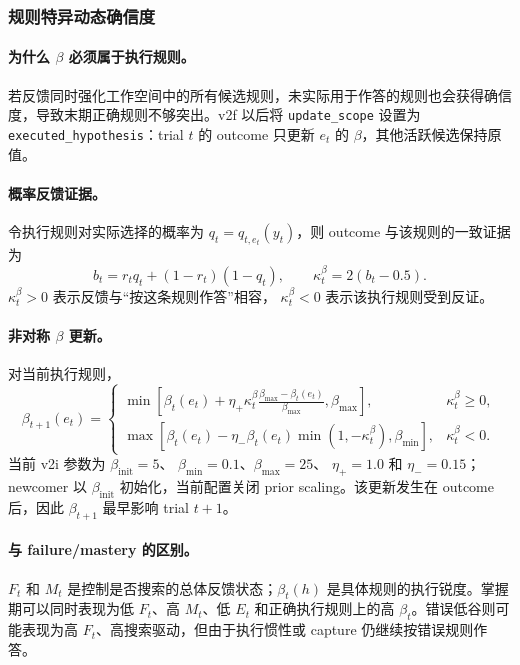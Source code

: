 \subsubsection{规则特异动态确信度}

\paragraph{为什么 $\beta$ 必须属于执行规则。}
若反馈同时强化工作空间中的所有候选规则，未实际用于作答的规则也会获得确信度，导致末期正确规则不够突出。v2f 以后将
\texttt{update\_scope} 设置为 \texttt{executed\_hypothesis}：trial $t$ 的 outcome 只更新 $e_t$ 的 $\beta$，其他活跃候选保持原值。

\paragraph{概率反馈证据。}
令执行规则对实际选择的概率为
$q_t=q_{t,e_t}(y_t)$，则 outcome 与该规则的一致证据为
\begin{equation}
b_t=r_tq_t+(1-r_t)(1-q_t),
\qquad
\kappa_t^\beta=2(b_t-0.5).
\label{eq:model0811-beta-evidence}
\end{equation}
$\kappa_t^\beta>0$ 表示反馈与“按这条规则作答”相容，
$\kappa_t^\beta<0$ 表示该执行规则受到反证。

\paragraph{非对称 $\beta$ 更新。}
对当前执行规则，
\begin{equation}
\beta_{t+1}(e_t)=
\begin{cases}
\min\!\left[
\beta_t(e_t)
+\eta_+\kappa_t^\beta
\displaystyle\frac{\beta_{\max}-\beta_t(e_t)}{\beta_{\max}},
\beta_{\max}\right],
&\kappa_t^\beta\ge0,
\\[6pt]
\max\!\left[
\beta_t(e_t)
-\eta_-\beta_t(e_t)
\min(1,-\kappa_t^\beta),
\beta_{\min}\right],
&\kappa_t^\beta<0.
\end{cases}
\label{eq:model0811-beta-update}
\end{equation}
当前 v2i 参数为 $\beta_{\mathrm{init}}=5$、
$\beta_{\min}=0.1$、$\beta_{\max}=25$、
$\eta_+=1.0$ 和 $\eta_-=0.15$；newcomer 以 $\beta_{\mathrm{init}}$ 初始化，当前配置关闭 prior scaling。该更新发生在 outcome 后，因此 $\beta_{t+1}$ 最早影响 trial $t+1$。

\paragraph{与 failure/mastery 的区别。}
$F_t$ 和 $M_t$ 是控制是否搜索的总体反馈状态；$\beta_t(h)$ 是具体规则的执行锐度。掌握期可以同时表现为低 $F_t$、高 $M_t$、低 $E_t$ 和正确执行规则上的高 $\beta_t$。错误低谷则可能表现为高 $F_t$、高搜索驱动，但由于执行惯性或 capture 仍继续按错误规则作答。


